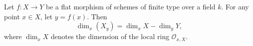 Let $f: X \to Y$ be a flat morphism of schemes of finite type over a field $k$. For any point $x \in X$, let $y = f(x)$. Then
$$\dim_x(X_y) = \dim_x X - \dim_y Y,$$
where $\dim_x X$ denotes the dimension of the local ring $\mathcal{O}_{x,X}$.
